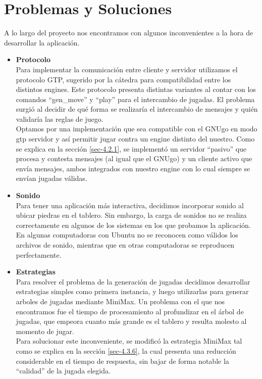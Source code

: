 \documentclass[11pt]{article}
\begin{document}
\newpage
\appendix
\section{Problemas y Soluciones}
A lo largo del proyecto nos encontramos con algunos inconvenientes a la hora de desarrollar la aplicaci\'on.

\begin{itemize}
  \item \textbf{Protocolo}\\
  Para implementar la comunicaci\'on entre cliente y servidor utilizamos el protocolo GTP, sugerido por la c\'atedra para compatibilidad entre los distintos engines. 
  Este protocolo presenta distintas variantes al contar con los comandos ``gen\_move'' y ``play'' para el intercambio de jugadas. El problema surgi\'o al decidir
  de qu\'e forma se realizar\'ia el intercambio de mensajes y qui\'en validar\'ia las reglas de juego. \\
  Optamos por una implementaci\'on que sea compatible con el GNUgo en modo gtp servidor y as\'i permitir jugar contra un engine distinto del nuestro. 
  Como se explica en la secci\'on \ref{sec-4.2.1}, se implement\'o un servidor ``pasivo'' que procesa y contesta mensajes (al igual que el GNUgo) y un cliente
  activo que env\'ia mensajes, ambos integrados con nuestro engine con lo cual siempre se env\'ian jugadas v\'alidas.

  \item \textbf{Sonido}\\
  Para tener una aplicaci\'on m\'as interactiva, decidimos incorporar sonido al ubicar piedras en el tablero. Sin embargo, la carga de sonidos no se realiza correctamente
  en algunos de los sistemas en los que probamos la aplicaci\'on. En algunas computadoras con Ubuntu no se reconocen como v\'alidos los archivos de sonido, mientras 
  que en otras computadoras se reproducen perfectamente.

  \item \textbf{Estrategias} \\
  Para resolver el problema de la generaci\'on de jugadas decidimos desarrollar estrategias simples como primera instancia, y luego utilizarlas para generar arboles de 
  jugadas mediante MiniMax. Un problema con el que nos encontramos fue el tiempo de procesamiento al profundizar en el \'arbol de jugadas, que empeora cuanto m\'as grande es el tablero 
  y resulta molesto al momento de jugar. \\
  Para solucionar este inconveniente, se modific\'o la estrategia MiniMax tal como se explica en la secci\'on \ref{sec-4.3.6}, la cual presenta una reducci\'on considerable en el
  tiempo de respuesta, sin bajar de forma notable la ``calidad'' de la jugada elegida.

  
\end{itemize}
\end{document}
